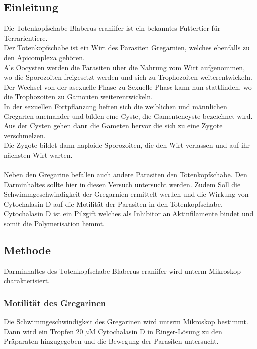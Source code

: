 \documentclass[oneside,10pt,a4paper]{report}
\begin{document}
			\subsection{Einleitung}
				Die Totenkopfschabe Blaberus craniifer ist ein bekanntes Futtertier für Terrarientiere.\\
				Der Totenkopfschabe ist ein Wirt des Parasiten Gregarnien, welches ebenfalls zu den Apicomplexa gehören.\\
				Als Oocysten werden die Parasiten über die Nahrung vom Wirt aufgenommen, wo die Sporozoiten freigesetzt werden und sich zu Trophozoiten weiterentwickeln.
				Der Wechsel von der asexuelle Phase zu Sexuelle Phase kann nun stattfinden, wo die Trophozoiten zu Gamonten weiterentwickeln. \\
				In der sexuellen Fortpflanzung heften sich die weiblichen und männlichen Gregarien aneinander und bilden eine Cyste, die Gamontencyste bezeichnet wird. Aus der Cysten gehen dann die Gameten hervor die sich zu eine Zygote verschmelzen.\\
				Die Zygote bildet dann haploide Sporozoiten, die den Wirt verlassen und auf ihr nächsten Wirt warten\cite{Gregarinen}.\\
				\\
				Neben den Gregarine befallen auch andere Parasiten den Totenkopfschabe. Den Darminhaltes sollte hier in diesen Versuch untersucht werden. Zudem Soll die Schwimmgeschwindigkeit der Gregarnien ermittelt werden und die Wirkung von Cytochalasin D auf die Motilität der Parasiten in den Totenkopfschabe.\\
				Cytochalasin D ist ein Pilzgift welches als Inhibitor an Aktinfilamente bindet und somit die Polymerisation hemmt\cite{aktinhem}.
			\subsection{Methode}
				Darminhaltes des Totenkopfschabe Blaberus craniifer wird unterm Mikroskop charakterisiert.\\
				
				\subsubsection{Motilität des Gregarinen}
					Die Schwimmgeschwindigkeit des Gregarinen wird unterm Mikroskop bestimmt.\\
					Dann wird ein Tropfen 20 $\mu$M Cytochalasin D in Ringer-Lösung zu den Präparaten hinzugegeben und die Bewegung der Parasiten untersucht.\\
				
\end{document}
